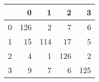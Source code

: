 \begin{tabular}{lrrrr}
\toprule
{} &    0 &    1 &    2 &    3 \\
\midrule
0 &  126 &    2 &    7 &    6 \\
1 &   15 &  114 &   17 &    5 \\
2 &    4 &    1 &  126 &    2 \\
3 &    9 &    7 &    6 &  125 \\
\bottomrule
\end{tabular}
